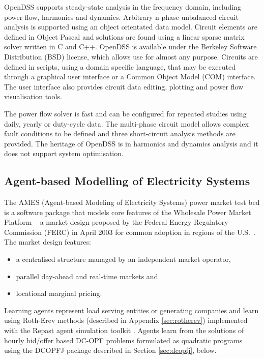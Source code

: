 OpenDSS supports steady-state analysis in the frequency domain, including power
flow, harmonics and dynamics.  Arbitrary n-phase unbalanced circuit analysis is supported using an object orientated data model.  Circuit elements are defined in Object Pascal
and solutions are found using a linear sparse matrix solver written in C and
C++.  OpenDSS is available under the Berkeley Software Distribution (BSD)
license, which allows use for almost any purpose.  Circuits are defined in
scripts, using a domain specific language, that may be executed through a
graphical user interface or a Common Object Model (COM) interface.  The user
interface also provides circuit data editing, plotting and power flow
visualisation tools.

The power flow solver is fast and can be configured for repeated
studies using daily, yearly or duty-cycle data.  The multi-phase circuit model allows
complex fault conditions to be defined and three short-circuit analysis methods
are provided.  The heritage of OpenDSS is in harmonics and dynamics analysis
and it does not support system optimisation.

\subsection{Agent-based Modelling of Electricity Systems}
\label{sec:ames}
The AMES (Agent-based Modeling of Electricity Systems) power market test bed is
a software package that models core features of the Wholesale Power Market
Platform -- a market design proposed by the Federal Energy Regulatory
Commission (FERC) in April 2003 for common adoption in regions of the
U.S.~\cite{tesfatsi:wpmp}. The market design features:
\begin{itemize}
  \item a centralised structure managed by an independent market operator,
  \item parallel day-ahead and real-time markets and
  \item locational marginal pricing.
\end{itemize}
Learning agents represent load serving entities or generating companies and
learn using Roth-Erev methods (described in Appendix \ref{sec:rotherev})
implemented with the Repast agent simulation toolkit \cite{gieseler:thesis}.
Agents learn from the solutions of hourly bid/offer based
DC-OPF problems formulated as quadratic programs using the DCOPFJ package
\cite{tesfatsi:dcopf} described in Section \ref{sec:dcopfj}, below.


